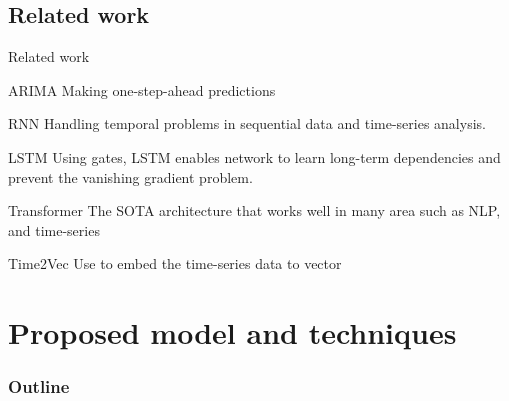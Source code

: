 \documentclass[compress, mathserif, fleqn, 10pt]{beamer}
\begin{document}
	\subsection{Related work}
	\begin{frame}{Related work}
		\begin{block}{ARIMA}
			Making one-step-ahead predictions
		\end{block}
		\begin{block}{RNN}
			Handling temporal problems in sequential data and time-series analysis.
		\end{block}
		\begin{block}{LSTM}
			Using gates, LSTM enables network to learn long-term dependencies and
			prevent the vanishing gradient problem.
		\end{block}
		\begin{block}{Transformer}
			The SOTA architecture that works well in many area such as NLP, and time-series
		\end{block}
		\begin{block}{Time2Vec}
			Use to embed the time-series data to vector
		\end{block}
	\end{frame}
	
	\section{Proposed model and techniques}
	\begin{frame}
		\frametitle{Outline}
		\tableofcontents[currentsection]
	\end{frame}
	
	
	
\end{document}
